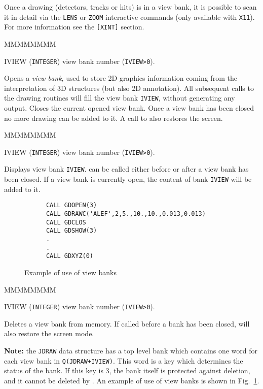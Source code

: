 Once a drawing (detectors, tracks or hits) is in a view bank, it is 
possible to scan it in detail via the {\tt LENS} or {\tt ZOOM} interactive
commands (only available with {\tt X11}). For more information see
the {\tt [XINT]} section.


\begin{DLtt}{MMMMMMMM}
\item[IVIEW] ({\tt INTEGER}) view bank number ({\tt IVIEW>0}).
\end{DLtt}

Opens a {\it view bank}, used to store 2D graphics information
coming from the interpretation of 3D structures (but also 2D annotation).
All subsequent calls to the drawing routines will fill the
view bank {\tt IVIEW}, without generating any output.
Closes the current opened view bank. Once a view bank has been closed
no more drawing can be added to it. A call to  also restores the
screen.


\begin{DLtt}{MMMMMMMM}
\item[IVIEW] ({\tt INTEGER}) view bank number ({\tt IVIEW>0}).
\end{DLtt}

Displays view bank {\tt IVIEW}.  can be called either
before or after a view bank has been closed. If a view bank is currently
open, the content of bank {\tt IVIEW} will be added to it.

\begin{figure}[hbt]
     \centering
\begin{verbatim}
      CALL GDOPEN(3)
      CALL GDRAWC('ALEF',2,5.,10.,10.,0.013,0.013)
      CALL GDCLOS
      CALL GDSHOW(3)
      .
      .
      CALL GDXYZ(0)
\end{verbatim}
     \caption{Example of use of view banks}
     \label{fg:draw300-1}
\end{figure}
 

\begin{DLtt}{MMMMMMMM}
\item[IVIEW] ({\tt INTEGER}) view bank number ({\tt IVIEW>0}).
\end{DLtt}

Deletes a view bank from memory. If called before a bank has been closed,
 will also restore the screen mode. 

{\bf Note:} the {\tt JDRAW} data structure has a top level bank which 
contains one word for each view bank in {\tt Q(JDRAW+IVIEW)}. This
word is a key which determines the status of the bank. If this key 
is 3, the bank itself is protected against deletion, and it cannot be 
deleted by . An example of use of view banks is shown in 
Fig.~\ref{fg:draw300-1}.
